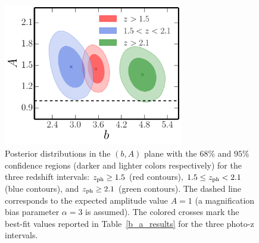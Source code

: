 \begin{figure} %
\centering %
\includegraphics[width=0.7\textwidth]{Chapter4/Images/b_A_kggg_2015}
\caption{Posterior distributions in the $(b,A)$ plane with the $68\%$ and $95\%$ confidence regions (darker and lighter colors respectively) for the three redshift intervals: $z_{\rm{ph}} \ge 1.5$ (red contours), $1.5 \le z_{\rm{ph}} < 2.1$ (blue contours), and $z_{\rm{ph}} \ge 2.1$ (green contours). The dashed line corresponds to the expected amplitude value $A=1$ (a magnification bias parameter $\alpha=3$ is assumed). The colored crosses mark the best-fit values reported in Table~\eqref{b_a_results} for the three photo-z intervals.    \label{fig:b_A_kggg_2015}}
\end{figure}


